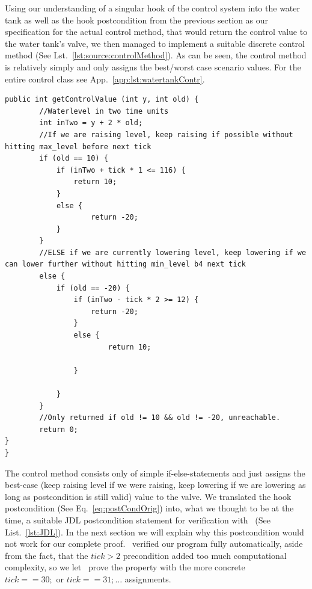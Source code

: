 Using our understanding of a singular hook of the control system into the water tank as well as the hook postcondition from the previous section as our specification for the actual control method, that would return the control value to the water tank's valve, we then managed to implement a suitable discrete control method (See Lst.~\ref{lst:source:controlMethod}). As can be seen, the control method is relatively simply and only assigns the best/worst case scenario values. For the entire control class see App.~\ref{app:lst:watertankContr}.

\begin{lstlisting}[label=lst:source:controlMethod]
public int getControlValue (int y, int old) {
		//Waterlevel in two time units
		int inTwo = y + 2 * old;
		//If we are raising level, keep raising if possible without hitting max_level before next tick
		if (old == 10) {
			if (inTwo + tick * 1 <= 116) {
				return 10;
			}
			else {
					return -20;
			}
		}
		//ELSE if we are currently lowering level, keep lowering if we can lower further without hitting min_level b4 next tick
		else {
			if (old == -20) {
				if (inTwo - tick * 2 >= 12) {
					return -20;
				}
				else {
						return 10;
				
				}
		
			}
		}
		//Only returned if old != 10 && old != -20, unreachable.
		return 0;
}
}
\end{lstlisting}

The control method consists only of simple if-else-statements and just assigns the best-case (keep raising level if we were raising, keep lowering if we are lowering as long as postcondition is still valid) value to the valve. We translated the hook postcondition (See  Eq.~\ref{eq:postCondOrig}) into, what we thought to be at the time, a suitable JDL postcondition statement for verification with \key~(See List.~\ref{lst:JDL}). In the next section we will explain why this postcondition would not work for our complete proof. \key~verified our program fully automatically, aside from the fact, that the \(tick>2\) precondition added too much computational complexity, so we let \key~prove the property with the more concrete \(tick==30; \textrm{ or }tick==31;\dots\) assignments. 


